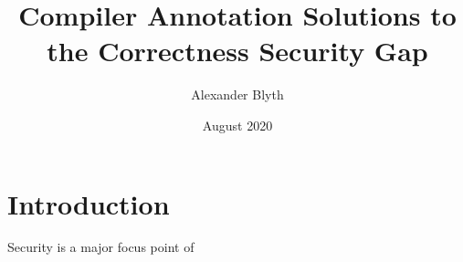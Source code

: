 \documentclass[twocolumn]{article}
\title{Compiler Annotation Solutions to the Correctness Security Gap}
\author{Alexander Blyth}
\date{August 2020}
\begin{document}
    \maketitle

    \section{Introduction}
    
    Security is a major focus point of \cite{einstein}

    \printbibliography
    
\end{document}
